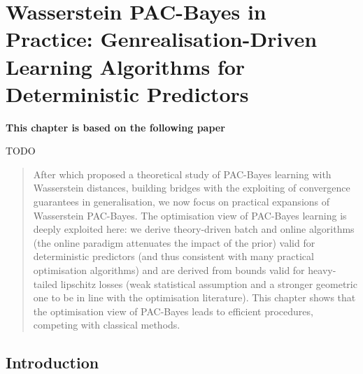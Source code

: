 \chapter[Wasserstein PAC-Bayes in Practice: Genrealisation-Driven Learning Algorithms for Deterministic Predictors]{Wasserstein PAC-Bayes in Practice: Genrealisation-Driven Learning Algorithms for Deterministic Predictors}
\label{chap: wpb-practical}
\addchapterlof
\addchapterloe

\vspace{-2.0cm}
\begin{center}
\textbf{This chapter is based on the following paper}\\[-0.1cm]
\end{center}
TODO

\vspace{0.2cm}
\minitoc 

\begin{abstract}
\vspace{-0.2cm}
After  which proposed a theoretical study of PAC-Bayes learning with Wasserstein distances, building bridges with the exploiting of convergence guarantees in generalisation, we now focus on practical expansions of Wasserstein PAC-Bayes. The optimisation view of PAC-Bayes learning is deeply exploited here: we derive theory-driven batch and online algorithms (the online paradigm attenuates the impact of the prior) valid for deterministic predictors (and thus consistent with many practical optimisation algorithms) and are derived from bounds valid for heavy-tailed lipschitz losses (weak statistical assumption and a stronger geometric one to be in line with the optimisation literature). This chapter shows that the optimisation view of PAC-Bayes leads to efficient procedures, competing with classical methods.
\end{abstract}

\newpage
    
\section{Introduction}

